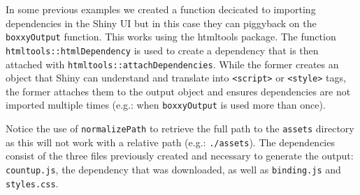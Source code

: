 \documentclass[10pt,]{krantz}
\makeatletter
\newenvironment{Shaded}{\begin{snugshade}}{\end{snugshade}}
\newcommand{\CommentTok}[1]{\textcolor[rgb]{0.37,0.37,0.37}{\textit{#1}}}
\newcommand{\ControlFlowTok}[1]{\textcolor[rgb]{0.27,0.27,0.27}{\textbf{#1}}}
\newcommand{\DataTypeTok}[1]{\textcolor[rgb]{0.27,0.27,0.27}{#1}}
\newcommand{\KeywordTok}[1]{\textcolor[rgb]{0.27,0.27,0.27}{\textbf{#1}}}
\newcommand{\NormalTok}[1]{#1}
\newcommand{\OperatorTok}[1]{\textcolor[rgb]{0.43,0.43,0.43}{\textbf{#1}}}
\newcommand{\StringTok}[1]{\textcolor[rgb]{0.5,0.5,0.5}{#1}}
\newenvironment{kframe}{%
\medskip{}
\setlength{\fboxsep}{.8em}
 \def\at@end@of@kframe{}%
 \ifinner\ifhmode%
  \def\at@end@of@kframe{\end{minipage}}%
  \begin{minipage}{\columnwidth}%
 \fi\fi%
 \def\FrameCommand##1{\hskip\@totalleftmargin \hskip-\fboxsep
 \colorbox{shadecolor}{##1}\hskip-\fboxsep
     \hskip-\linewidth \hskip-\@totalleftmargin \hskip\columnwidth}%
 \MakeFramed {\advance\hsize-\width
   \@totalleftmargin\z@ \linewidth\hsize
   \@setminipage}}%
 {\par\unskip\endMakeFramed%
 \at@end@of@kframe}
\renewenvironment{Shaded}{\begin{kframe}}{\end{kframe}}
\makeatother
\begin{document}
In some previous examples we created a function decicated to importing dependencies in the Shiny UI but in this case they can piggyback on the \texttt{boxxyOutput} function. This works using the htmltools package. The function \texttt{htmltools::htmlDependency} is used to create a dependency that is then attached with \texttt{htmltools::attachDependencies}. While the former creates an object that Shiny can understand and translate into \texttt{\textless{}script\textgreater{}} or \texttt{\textless{}style\textgreater{}} tags, the former attaches them to the output object and ensures dependencies are not imported multiple times (e.g.: when \texttt{boxxyOutput} is used more than once).

Notice the use of \texttt{normalizePath} to retrieve the full path to the \texttt{assets} directory as this will not work with a relative path (e.g.: \texttt{./assets}). The dependencies consist of the three files previously created and necessary to generate the output: \texttt{countup.js}, the dependency that was downloaded, as well as \texttt{binding.js} and \texttt{styles.css}.

\begin{Shaded}
\end{Shaded}
\end{document}
